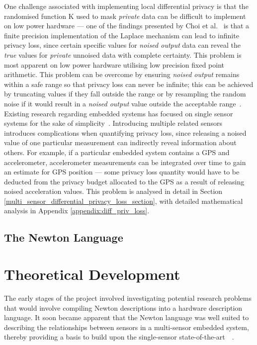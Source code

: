 \documentclass[12pt]{article}
\begin{document}
    One challenge associated with implementing local differential privacy is that the randomised function K used to mask \textit{private} data can be difficult to implement on low power hardware --- one of the findings presented by Choi et al.~\cite{Choi2018GuaranteeingLD} is that a finite precision implementation of the Laplace mechanism can lead to infinite privacy loss, since certain specific values for \textit{noised output} data can reveal the \textit{true} values for \textit{private} unnoised data with complete certainty. This problem is most apparent on low power hardware utilising low precision fixed point arithmetic. This problem can be overcome by ensuring \textit{noised output} remains within a safe range so that privacy loss can never be infinite; this can be achieved by truncating values if they fall outside the range or by resampling the random noise if it would result in a \textit{noised output} value outside the acceptable range~\cite{Choi2018GuaranteeingLD}.\\

    Existing research regarding embedded systems has focused on single sensor systems for the sake of simplicity~\cite{Choi2018GuaranteeingLD}. Introducing multiple related sensors introduces complications when quantifying privacy loss, since releasing a noised value of one particular measurement can indirectly reveal information about others. For example, if a particular embedded system contains a GPS and accelerometer, accelerometer measurements can be integrated over time to gain an estimate for GPS position --- some privacy loss quantity would have to be deducted from the privacy budget allocated to the GPS as a result of releasing noised acceleration values. This problem is analysed in detail in Section \ref{multi_sensor_differential_privacy_loss_section}, with detailed mathematical analysis in Appendix \ref{appendix:diff_priv_loss}.

  \subsection{The Newton Language}


\newpage



%
%

\section{Theoretical Development}
  The early stages of the project involved investigating potential research problems that would involve compiling Newton descriptions into a hardware description language. It soon became apparent that the Newton language was well suited to describing the relationships between sensors in a multi-sensor embedded system, thereby providing a basis to build upon the single-sensor state-of-the-art~\cite{Choi2018GuaranteeingLD}~\cite{diffpriv_2006}.
\end{document}
